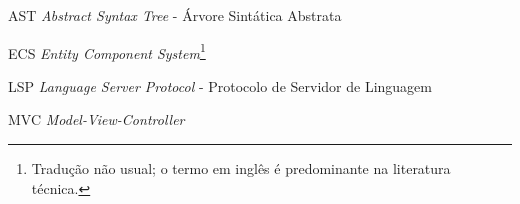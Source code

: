 \begin{siglas}
	\item[AST] \textit{Abstract Syntax Tree} - Árvore Sintática Abstrata
	\item[ECS] \textit{Entity Component System}\footnote{Tradução não usual; o termo em inglês é predominante na literatura técnica.}
	\item[LSP] \textit{Language Server Protocol} - Protocolo de Servidor de Linguagem
	\item[MVC] \textit{Model-View-Controller}\footnotemark[1]
\end{siglas}
